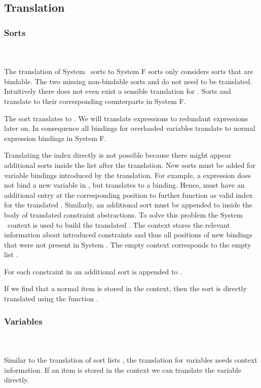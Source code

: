 \subsection{Translation}
\subsubsection{Sorts}\hfill\\\\
The translation of System \Fo\ sorts to System F sorts only considers sorts that are bindable. 
The two missing non-bindable sorts  and  do not need to be translated. 
Intuitively there does not even exist a sensible translation for .
\DPTSort
Sorts  and  translate to their corresponding counterparts in System F. 

\noindent The sort  translates to . We will translate  expressions to redundant  expressions later on. In consequence all bindings for overloaded variables translate to normal expression bindings in System F.

\noindent Translating the index  directly is not possible because there might appear additional sorts inside the list after the translation. 
New sorts must be added for variable bindings introduced by the translation. 
For example, a    \Constr{=}    expression does not bind a new variable in , but translates to a     binding. 
Hence,  must have an additional entry  at the corresponding position to further function as valid index for the translated . 
Similarly, an additional sort  must be appended to  inside the body of translated constraint abstractions.
To solve this problem the System \Fo\ context  is used to build the translated . 
The context stores the relevant information about introduced constraints and thus all positions of new bindings that were not present in System \Fo. 
\DPTSorts
The empty context  corresponds to the empty list \Constr{[]}.

\noindent For each constraint in  an additional sort  is appended to .

\noindent If we find that a normal item is stored in the context, then the sort  is directly translated using the function .

\subsubsection{Variables}\hfill\\\\
Similar to the translation of sort lists , the translation for variables needs context information.  
\DPTVar
If an item is stored in the context we can translate the variable directly. 

